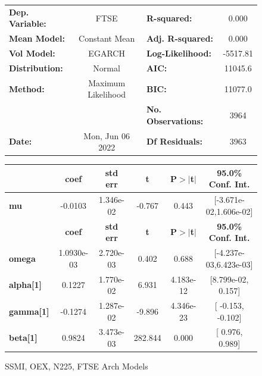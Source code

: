 \documentclass[a4paper, oneside]{discothesis}
\begin{document}
\begin{figure}
\begin{multicols}{2}
{  
\begin{center}
\begin{tabular}{lclc}
\toprule
\textbf{Dep. Variable:} &        FTSE        & \textbf{  R-squared:         } &     0.000   \\
\textbf{Mean Model:}    &   Constant Mean    & \textbf{  Adj. R-squared:    } &     0.000   \\
\textbf{Vol Model:}     &       EGARCH       & \textbf{  Log-Likelihood:    } &   -5517.81  \\
\textbf{Distribution:}  &       Normal       & \textbf{  AIC:               } &    11045.6  \\
\textbf{Method:}        & Maximum Likelihood & \textbf{  BIC:               } &    11077.0  \\
\textbf{}               &                    & \textbf{  No. Observations:  } &    3964     \\
\textbf{Date:}          &  Mon, Jun 06 2022  & \textbf{  Df Residuals:      } &    3963     \\
\bottomrule
\end{tabular}
\begin{tabular}{lccccc}
            & \textbf{coef} & \textbf{std err} & \textbf{t} & \textbf{P$> |$t$|$} & \textbf{95.0\% Conf. Int.}  \\
\midrule
\textbf{mu} &      -0.0103  &    1.346e-02     &    -0.767  &          0.443       &   [-3.671e-02,1.606e-02]    \\
                  & \textbf{coef} & \textbf{std err} & \textbf{t} & \textbf{P$> |$t$|$} & \textbf{95.0\% Conf. Int.}  \\
\midrule
\textbf{omega}    &   1.0930e-03  &    2.720e-03     &     0.402  &          0.688       &   [-4.237e-03,6.423e-03]    \\
\textbf{alpha[1]} &       0.1227  &    1.770e-02     &     6.931  &      4.183e-12       &    [8.799e-02,  0.157]      \\
\textbf{gamma[1]} &      -0.1274  &    1.287e-02     &    -9.896  &      4.346e-23       &     [ -0.153, -0.102]       \\
\textbf{beta[1]}  &       0.9824  &    3.473e-03     &   282.844  &        0.000         &     [  0.976,  0.989]       \\
\bottomrule
\end{tabular}
\end{center}


}
\end{multicols}
\caption{SSMI, OEX, N225, FTSE Arch Models}
\label{second_8}
\end{figure}
\end{document}
